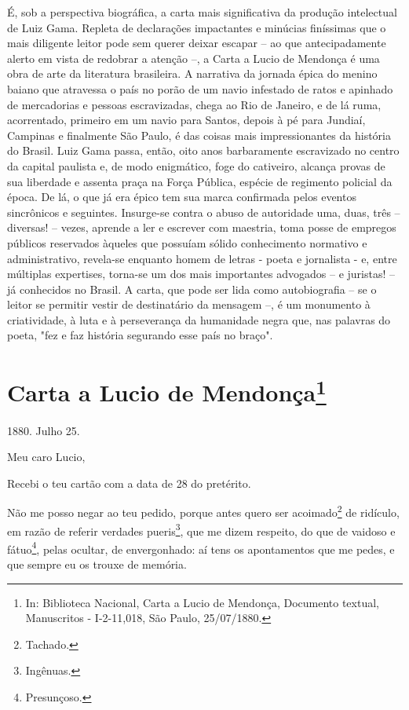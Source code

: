\pagebreak
\paginabranca
\mbox{}\vfill
\thispagestyle{empty}

{\small\noindent
É, sob a perspectiva biográfica, a carta mais significativa da
produção intelectual de Luiz Gama. Repleta de declarações impactantes e
minúcias finíssimas que o mais diligente leitor pode sem querer deixar
escapar -- ao que antecipadamente alerto em vista de redobrar a atenção
--, a Carta a Lucio de Mendonça é uma obra de arte da literatura
brasileira. A narrativa da jornada épica do menino baiano que atravessa
o país no porão de um navio infestado de ratos e apinhado de mercadorias
e pessoas escravizadas, chega ao Rio de Janeiro, e de lá ruma,
acorrentado, primeiro em um navio para Santos, depois à pé para Jundiaí,
Campinas e finalmente São Paulo, é das coisas mais impressionantes da
história do Brasil. Luiz Gama passa, então, oito anos barbaramente
escravizado no centro da capital paulista e, de modo enigmático, foge do
cativeiro, alcança provas de sua liberdade e assenta praça na Força
Pública, espécie de regimento policial da época. De lá, o que já era
épico tem sua marca confirmada pelos eventos sincrônicos e seguintes.
Insurge-se contra o abuso de autoridade uma, duas, três -- diversas! --
vezes, aprende a ler e escrever com maestria, toma posse de empregos
públicos reservados àqueles que possuíam sólido conhecimento normativo e
administrativo, revela-se enquanto homem de letras - poeta e jornalista
- e, entre múltiplas expertises, torna-se um dos mais importantes
advogados -- e juristas! -- já conhecidos no Brasil. A carta, que pode
ser lida como autobiografia -- se o leitor se permitir vestir de
destinatário da mensagem --, é um monumento à criatividade, à luta e à
perseverança da humanidade negra que, nas palavras do poeta, "fez e faz
história segurando esse país no braço". }


\chapter{Carta a Lucio de Mendonça\footnote[*]{In: Biblioteca
  Nacional, Carta a Lucio de Mendonça, Documento textual, Manuscritos -
  I-2-11,018, São Paulo, 25/07/1880.}}


1880. Julho 25.

Meu caro Lucio,

Recebi o teu cartão com a data de 28 do pretérito.

Não me posso negar ao teu pedido, porque antes quero ser
acoimado\footnote{Tachado.} de ridículo, em razão de referir verdades
pueris\footnote{Ingênuas.}, que me dizem respeito, do que de vaidoso e
fátuo\footnote{Presunçoso.}, pelas ocultar, de envergonhado: aí tens
os apontamentos que me pedes, e que sempre eu os trouxe de memória.

